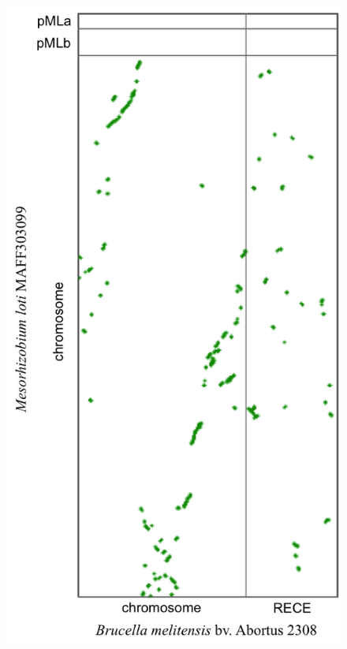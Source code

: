 \begin{figure}[H]
\begin{center}
\begin{minipage}{0.5\textwidth}
		\label{figsyntbruc4}
	\end{minipage}
	\begin{minipage}{0.5\textwidth}
		\includegraphics[width=1.1\textwidth]{./img/synteny/new/fig8_8b.png}
		\label{figsyntbruc2}
	\end{minipage}
	\end{center}
\end{figure}

